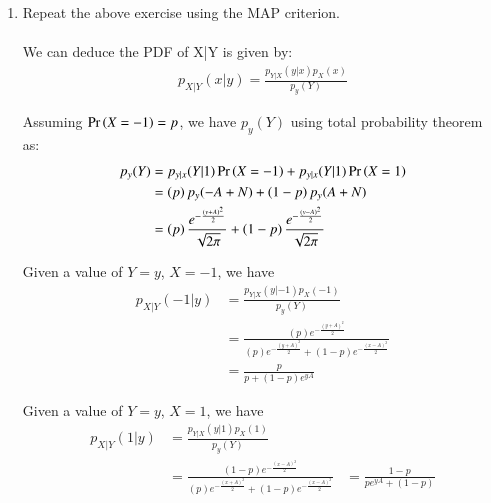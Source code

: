\documentclass[journal,12pt,twocolumn]{IEEEtran}
\renewcommand\thesection{\arabic{section}}
\begin{document}
\begin{enumerate}[label=\thesection.\arabic*
,ref=\thesection.\theenumi]
	We again minimise this, using
	\begin{align}
		\frac{dP_e}{dA} = 0
	\end{align}
	\begin{align}
		\left(p\right) \frac{e^{-\frac{\left( \delta - A\right)^2}{2}}}{\sqrt{2\pi}} - \left(1-p\right) \frac{e^{-\frac{\left( \delta + A\right)^2}{2}}}{\sqrt{2\pi}} = 0
	\end{align}
	\begin{align}
		\frac{p}{1-p} = e^{-2A\delta}
	\end{align}
	\begin{align}
		\delta = \frac{1}{2A} \ln{\frac{1-p}{p}}
	\end{align}
	

\item Repeat the above exercise using the MAP criterion.
	\\
	\solution
	\\
	We can deduce the PDF of X|Y is given by:
	\begin{align}
		p_{X|Y}(x|y) = \frac{p_{Y|X}(y|x) p_X(x)}{p_y(Y)}
		\label{eq:Bayes}
	\end{align}

	Assuming $\Pr\left(X = -1\right) = p$, we have $p_y(Y)$ using total probability theorem as:
	\begin{align}
		p_y(Y) &= p_{y|x}(Y|1) \Pr\left(X=-1\right) + p_{y|x}(Y|1) \Pr\left(X=1\right) \\
		&= \left(p\right) p_y(-A+N) + \left(1-p\right) p_y(A+N) \\
		&= \left(p\right) \frac{e^{-\frac{(y+A)^2}{2}}}{\sqrt{2\pi}} + \left(1-p\right) \frac{e^{-\frac{(y-A)^2}{2}}}{\sqrt{2\pi}}
	\end{align}

	Given a value of $Y = y$, $X = -1$, we have
	\begin{align}
		p_{X|Y}(-1|y) &= \frac{p_{Y|X}(y|-1) p_X(-1)}{p_y(Y)} \\
		&= \frac{\left(p\right) e^{-\frac{(y+A)^2}{2}}}{\left(p\right) e^{-\frac{(y+A)^2}{2}} + \left(1-p\right) e^{-\frac{(x-A)^2}{2}}} \\
		&= \frac{p}{p + \left(1-p\right) e^{yA}}
	\end{align}

	Given a value of $Y = y$, $X = 1$, we have
	\begin{align}
		p_{X|Y}(1|y) &= \frac{p_{Y|X}(y|1) p_X(1)}{p_y(Y)} \\
		&= \frac{\left(1-p\right) e^{-\frac{(x-A)^2}{2}}}{\left(p\right) e^{-\frac{(x+A)^2}{2}} + \left(1-p\right) e^{-\frac{(x-A)^2}{2}}}
		&= \frac{1-p}{p e^{yA} + \left(1-p\right)}
	\end{align}


\end{enumerate}
\end{document}
